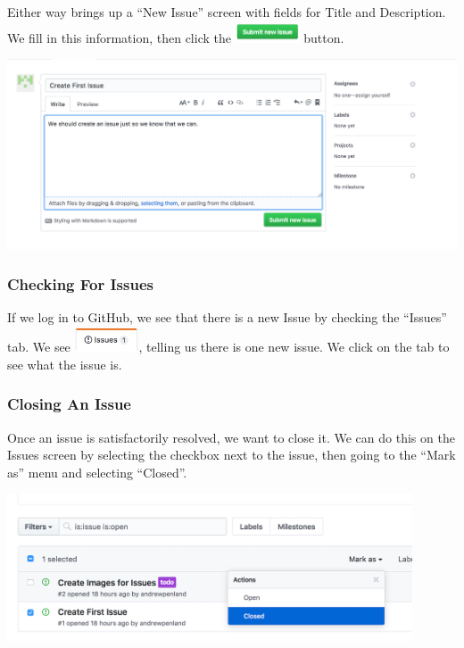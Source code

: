 \documentclass[11pt]{article}
\begin{document}
Either way brings up a ``New Issue'' screen with fields for Title and Description. We fill in this information, then click the \includegraphics[width=0.75in]{SubmitNewIssue} button. 

\begin{center}
\includegraphics[width=\textwidth]{CreatingAnIssue}
\end{center}

\subsubsection{Checking For Issues}

If we log in to GitHub, we see that there is a new Issue by checking the ``Issues'' tab. We see \includegraphics[width=0.75in]{IssuesLink}, telling us there is one new issue. We click on the tab to see what the issue is.

\subsubsection{Closing An Issue} 

Once an issue is satisfactorily resolved, we want to close it. We can do this on the Issues screen by selecting the checkbox next to the issue, then going to the ``Mark as'' menu and selecting ``Closed''.

\begin{center}
\includegraphics[width=0.9\textwidth]{MarkIssueClosed}
\end{center}
\end{document}
